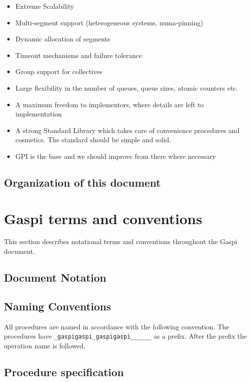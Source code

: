 \documentclass{article}
\makeatletter
\newlength{\st}\setlength{\st}{0pt}
\newcommand{\zerowsep}{\hskip 0pt plus 0.1pt minus 0.1pt}
\newcommand{\ZSEP}[1]{\ifx#1\@@@EOZ@@@\let\next\relax\else\ifx#1\_#1\zerowsep\else#1\fi\let\next\ZSEP\fi\next}
\newcommand{\zsep}[1]{\ZSEP{}#1\@@@EOZ@@@}
\newcommand{\gaspiprefix}{gaspi}
\newcommand{\GASPI}{{\sc Gaspi}}
\newcommand{\function}[1]{{\tt #1}}
\newcommand{\gaspifunction}[1]{\function{\protect\zsep{\gaspiprefix\_#1}}}
\makeatother
\begin{document}
\begin{itemize}
\item Extreme Scalability
\item Multi-segment support (heterogeneous systems, numa-pinning)
\item Dynamic allocation of segments
\item Timeout mechanisms and failure tolerance
\item Group support for collectives
\item Large flexibility in the number of queues, queue sizes, 
  atomic counters etc.
\item A maximum freedom to implementors, where details are left to 
  implementation
\item A strong Standard Library which takes care of convenience
  procedures and cosmetics. The standard should be simple and solid.
\item GPI is the base and we should improve from there where necessary
\end{itemize}

\subsection{Organization of this document}


\section{\GASPI{} terms and conventions}

This section describes notational terms and conventions throughout the \GASPI{}
document.

\subsection{Document Notation}

\subsection{Naming Conventions}

All procedures are named in accordance with the following convention.
The procedures have \gaspifunction{} as a prefix. After the prefix
the operation name is followed.


\subsection{Procedure specification}
\end{document}
